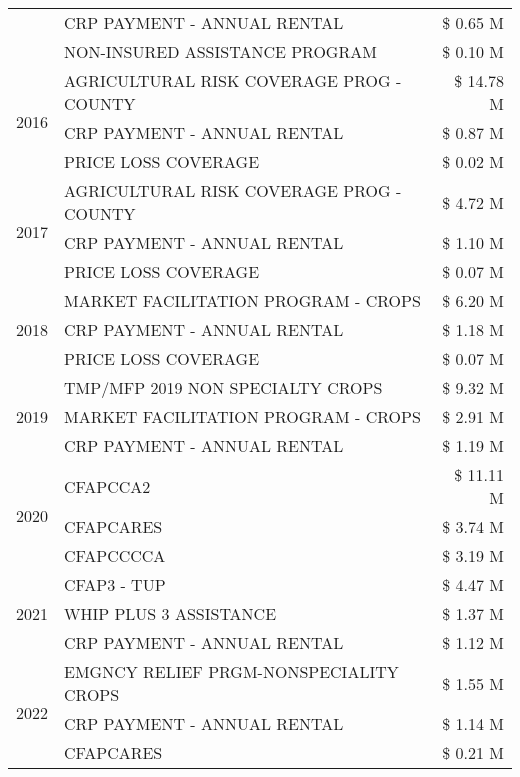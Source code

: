 \begin{tabular}{llr}
 & CRP PAYMENT - ANNUAL RENTAL & \$ 0.65 M \\
 & NON-INSURED ASSISTANCE PROGRAM & \$ 0.10 M \\
\cline{1-3}
\multirow[t]{3}{*}{2016} & AGRICULTURAL RISK COVERAGE PROG - COUNTY & \$ 14.78 M \\
 & CRP PAYMENT - ANNUAL RENTAL & \$ 0.87 M \\
 & PRICE LOSS COVERAGE & \$ 0.02 M \\
\cline{1-3}
\multirow[t]{3}{*}{2017} & AGRICULTURAL RISK COVERAGE PROG - COUNTY & \$ 4.72 M \\
 & CRP PAYMENT - ANNUAL RENTAL & \$ 1.10 M \\
 & PRICE LOSS COVERAGE & \$ 0.07 M \\
\cline{1-3}
\multirow[t]{3}{*}{2018} & MARKET FACILITATION PROGRAM - CROPS & \$ 6.20 M \\
 & CRP PAYMENT - ANNUAL RENTAL & \$ 1.18 M \\
 & PRICE LOSS COVERAGE & \$ 0.07 M \\
\cline{1-3}
\multirow[t]{3}{*}{2019} & TMP/MFP 2019 NON SPECIALTY CROPS & \$ 9.32 M \\
 & MARKET FACILITATION PROGRAM - CROPS & \$ 2.91 M \\
 & CRP PAYMENT - ANNUAL RENTAL & \$ 1.19 M \\
\cline{1-3}
\multirow[t]{3}{*}{2020} & CFAPCCA2 & \$ 11.11 M \\
 & CFAPCARES & \$ 3.74 M \\
 & CFAPCCCCA & \$ 3.19 M \\
\cline{1-3}
\multirow[t]{3}{*}{2021} & CFAP3 - TUP & \$ 4.47 M \\
 & WHIP PLUS 3 ASSISTANCE & \$ 1.37 M \\
 & CRP PAYMENT - ANNUAL RENTAL & \$ 1.12 M \\
\cline{1-3}
\multirow[t]{3}{*}{2022} & EMGNCY RELIEF PRGM-NONSPECIALITY CROPS & \$ 1.55 M \\
 & CRP PAYMENT - ANNUAL RENTAL & \$ 1.14 M \\
 & CFAPCARES & \$ 0.21 M \\
\cline{1-3}
\bottomrule
\end{tabular}
